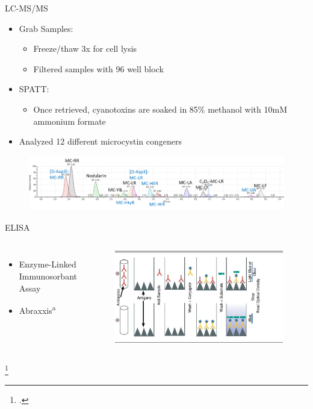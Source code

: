 \begin{frame}{LC-MS/MS}
	\begin{itemize}
		\item Grab Samples: 
		\begin{itemize}
			\item Freeze/thaw 3x for cell lysis 
			\item Filtered samples with 96 well block 
		\end{itemize}
		\item SPATT: 
		\begin{itemize}
			\item Once retrieved, cyanotoxins are soaked in 85\% methanol with 10mM ammonium formate
		\end{itemize}
		\item Analyzed 12 different microcystin congeners	
	\end{itemize}
	\begin{figure}
		\includegraphics[width=\textwidth]{../figures/LCMS_CONGENERS.png}
	\end{figure}
\end{frame}

\begin{frame}{ELISA}
	\begin{columns}
	\begin{itemize}
		\item Enzyme-Linked Immunosorbant Assay
		\item Abraxxis\textsuperscript{a}
	\end{itemize}
	\begin{figure}
		\includegraphics[width=\textwidth]{elisa.jpg}
	\end{figure}
\end{columns}
\footcitetext{[a], noauthor_saxitoxin_nodate}
\end{frame}
